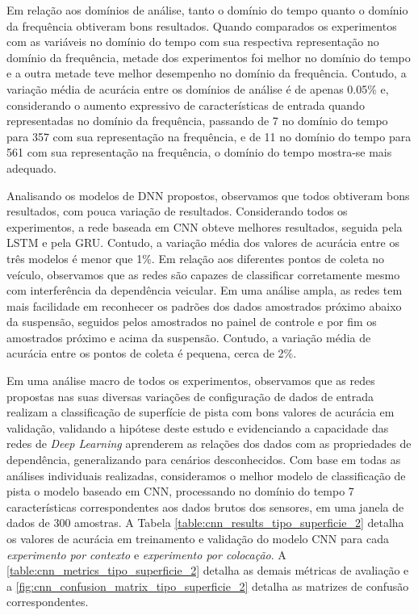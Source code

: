 Em relação aos domínios de análise, tanto o domínio do tempo quanto o domínio da frequência obtiveram bons resultados. Quando comparados os experimentos com as variáveis no domínio do tempo com sua respectiva representação no domínio da frequência, metade dos experimentos foi melhor no domínio do tempo e a outra metade teve melhor desempenho no domínio da frequência. Contudo, a variação média de acurácia entre os domínios de análise é de apenas 0.05\% e, considerando o aumento expressivo de características de entrada quando representadas no domínio da frequência, passando de 7 no domínio do tempo para 357 com sua representação na frequência, e de 11 no domínio do tempo para 561 com sua representação na frequência, o domínio do tempo mostra-se mais adequado.

Analisando os modelos de DNN propostos, observamos que todos obtiveram bons resultados, com pouca variação de resultados. Considerando todos os experimentos, a rede baseada em CNN obteve melhores resultados, seguida pela LSTM e pela GRU. Contudo, a variação média dos valores de acurácia entre os três modelos é menor que 1\%. Em relação aos diferentes pontos de coleta no veículo, observamos que as redes são capazes de classificar corretamente mesmo com interferência da dependência veicular. Em uma análise ampla, as redes tem mais facilidade em reconhecer os padrões dos dados amostrados próximo abaixo da suspensão, seguidos pelos amostrados no painel de controle e por fim os amostrados próximo e acima da suspensão. Contudo, a variação média de acurácia entre os pontos de coleta é pequena, cerca de 2\%.

Em uma análise macro de todos os experimentos, observamos que as redes propostas nas suas diversas variações de configuração de dados de entrada realizam a classificação de superfície de pista com bons valores de acurácia em validação, validando a hipótese deste estudo e evidenciando a capacidade das redes de \textit{Deep Learning} aprenderem as relações dos dados com as propriedades de dependência, generalizando para cenários desconhecidos. Com base em todas as análises individuais realizadas, consideramos o melhor modelo de classificação de pista o modelo baseado em CNN, processando no domínio do tempo 7 características correspondentes aos dados brutos dos sensores, em uma janela de dados de 300 amostras. A Tabela \ref{table:cnn_results_tipo_superficie_2} detalha os valores de acurácia em treinamento e validação do modelo CNN para cada \emph{experimento por contexto} e \emph{experimento por colocação}. A \autoref{table:cnn_metrics_tipo_superficie_2} detalha as demais métricas de avaliação e a \autoref{fig:cnn_confusion_matrix_tipo_superficie_2} detalha as matrizes de confusão correspondentes.

